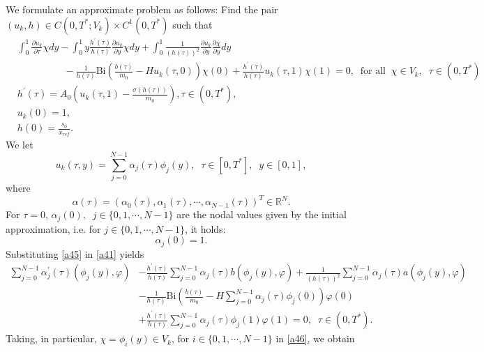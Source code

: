 \documentclass{article}
\begin{document}
We formulate an approximate problem as follows:  Find the pair $(u_k, h)
\in C (0, T^*; V_k) \times C^1(0, T^*)$ such that
\begin{align}
\nonumber&\displaystyle \int_0^1 \frac{\partial u_k}{\partial \tau} \chi  dy- \int_0^1 y \frac{h^{\prime}(\tau)}{h(\tau)}\frac{\partial u_k}{\partial y} \chi dy +  \int_0^1\frac{1}{(h(\tau))^2}\frac{\partial{u_k}}{\partial{y}}\frac{\partial\chi }{\partial y}  dy\\
\label{a41}&\hspace{2cm}- \frac{1}{h(\tau)} \text{Bi}\left(\frac{b(\tau)}{m_{0}}- Hu_k(\tau, 0)\right) \chi (0) +\frac{h^{\prime}(\tau)}{h(\tau)}u_k(\tau, 1)\chi (1) = 0,\;\; \text{for all}\;\; \chi \in V_k,\;\;\tau\in(0, T^*) \\
\label{a42} & h^{\prime}(\tau) = A_0\left(u_k(\tau, 1)-\frac{\sigma(h(\tau))}{m_0}\right), \tau\in(0, T^*),\\
\label{a43}& u_k(0) = 1,\\
\label{a44}& h(0) = \frac{s_0}{x_{ref}}.
\end{align}
We let 
\begin{equation}
\label{a45}
u_k(\tau,y) = \sum_{j=0}^{N-1}\alpha_j(\tau) \phi_j(y),\;\; \tau\in [0, T^*] ,\;\; y\in[0, 1], 
\end{equation}
where
\begin{equation*} \alpha(\tau) = ( \alpha_0(\tau),  \alpha_1(\tau),  \cdots,  \alpha_{N-1}(\tau))^T\in \mathbb{R}^N. \end{equation*}
For $\tau = 0$,  $\alpha_j(0),\;\;j \in\{0,1,\cdots, N-1\}$ are the nodal values given by the initial approximation, i.e. for $j \in\{0,1,\cdots, N-1\}$, it holds:
\begin{equation} \label{a51}\alpha_j(0) =  1 .\end{equation}
Substituting \eqref{a45} in  \eqref{a41} yields
\begin{align}
\nonumber \sum_{j=0}^{N-1}\alpha_j^{\prime}(\tau)( \phi_j(y), \varphi) &-  \frac{h^{\prime}(\tau)}{h(\tau)} \sum_{j=0}^{N-1}\alpha_j(\tau)b( \phi_j(y), \varphi ) +\frac{1}{(h(\tau))^2} \sum_{j=0}^{N-1}\alpha_j(\tau)a( \phi_j(y), \varphi ) \\
\nonumber& - \frac{1}{h(\tau)} \text{Bi}\left(\frac{b(\tau)}{m_{0}}- H\sum_{j=0}^{N-1}\alpha_j(\tau) \phi_j(0)\right) \varphi(0) \\
\label{a46}&+\frac{h^{\prime}(\tau)}{h(\tau)}\sum_{j=0}^{N-1}\alpha_j(\tau) \phi_j(1)\varphi(1) = 0,\;\; \tau\in(0, T^*). 
\end{align}
Taking, in particular, $\chi = \phi_i(y)\in V_k$, for $i \in\{0,1,\cdots, N-1\}$ in \eqref{a46},  we obtain
\end{document}
